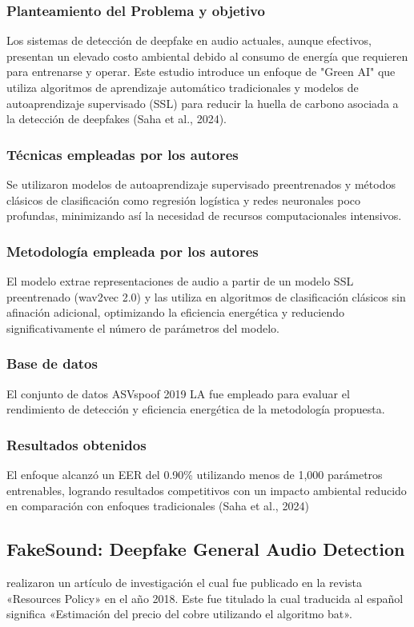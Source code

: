 \subsubsection{Planteamiento del Problema y objetivo }
Los sistemas de detección de deepfake en audio actuales, aunque efectivos, presentan un elevado costo ambiental debido al consumo de energía que requieren para entrenarse y operar. Este estudio introduce un enfoque de "Green AI" que utiliza algoritmos de aprendizaje automático tradicionales y modelos de autoaprendizaje supervisado (SSL) para reducir la huella de carbono asociada a la detección de deepfakes (Saha et al., 2024).

\subsubsection{Técnicas empleadas por los autores}
Se utilizaron modelos de autoaprendizaje supervisado preentrenados y métodos clásicos de clasificación como regresión logística y redes neuronales poco profundas, minimizando así la necesidad de recursos computacionales intensivos.

\subsubsection{Metodología empleada por los autores}
El modelo extrae representaciones de audio a partir de un modelo SSL preentrenado (wav2vec 2.0) y las utiliza en algoritmos de clasificación clásicos sin afinación adicional, optimizando la eficiencia energética y reduciendo significativamente el número de parámetros del modelo.

\subsubsection{Base de datos}
El conjunto de datos ASVspoof 2019 LA fue empleado para evaluar el rendimiento de detección y eficiencia energética de la metodología propuesta.

\subsubsection{Resultados obtenidos}
El enfoque alcanzó un EER del 0.90\% utilizando menos de 1,000 parámetros entrenables, logrando resultados competitivos con un impacto ambiental reducido en comparación con enfoques tradicionales (Saha et al., 2024)

\subsection{FakeSound: Deepfake General Audio Detection \citep*{pr_dehghani2018copper}}
\citeauthor{pr_dehghani2018copper} realizaron un artículo de investigación el cual fue publicado en la revista «Resources Policy» en el año 2018. Este fue titulado  la cual traducida al español significa «Estimación del precio del cobre utilizando el algoritmo bat».

